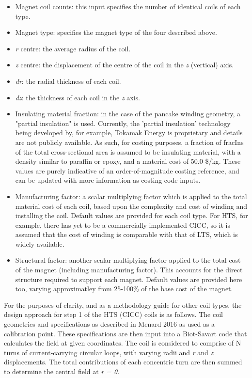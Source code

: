 \begin{itemize}
    \item Magnet coil counts: this input specifies the number of identical coils of each type.
    \item Magnet type: specifies the magnet type of the four described above.
    \item \textit{r} centre: the average radius of the coil.
    \item \textit{z} centre: the displacement of the centre of the coil in the \textit{z} (vertical) axis.
    \item \textit{dr}: the radial thickness of each coil.
    \item \textit{dz}: the thickness of each coil in the \textit{z} axis.
    \item Insulating material fraction: in the case of the pancake winding geometry, a "partial insulation" is used. Currently, the 'partial insulation' technology being developed by, for example, Tokamak Energy is proprietary and details are not publicly available. As such, for costing purposes, a fraction of fracIns of the total cross-sectional area is assumed to be insulating material, with a density similar to paraffin or epoxy, and a material cost of 50.0 \$/kg. These values are purely indicative of an order-of-magnitude costing reference, and can be updated with more information as costing code inputs.
    \item Manufacturing factor: a scalar multiplying factor which is applied to the total material cost of each coil, based upon the complexity and cost of winding and installing the coil. Default values are provided for each coil type. For HTS, for example, there has yet to be a commercially implemented CICC, so it is assumed that the cost of winding is comparable with that of LTS, which is widely available. 
    \item Structural factor: another scalar multiplying factor applied to the total cost of the magnet (including manufacturing factor). This accounts for the direct structure required to support each magnet. Default values are provided here too, varying approximatley from 25-100\% of the base cost of the magnet.
\end{itemize}

For the purposes of clarity, and as a methodology guide for other coil types, the design approach for step 1 of the HTS (CICC) coils is as follows. The coil geometries and specifications as described in Menard 2016 \cite{Menard2016} as used as a calibration point. These specifications are then input into a Biot-Savart code that calculates the field at given coordinates. The coil is considered to comprise of N turns of current-carrying circular loops, with varying radii and \textit{r} and \textit{z} displacements. The total contributions of each concentric turn are then summed to determine the central field at \textit{r = 0}.\\

